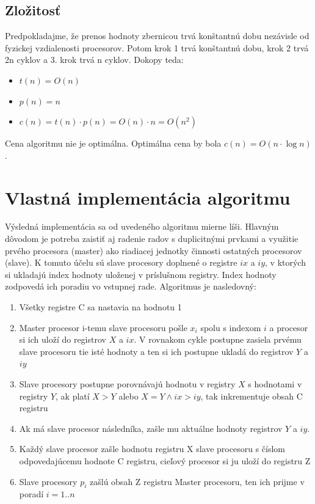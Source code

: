 \documentclass[a4paper,11pt]{article}
\begin{document}
\subsection{Zložitosť}
Predpokladajme, že prenos hodnoty zbernicou trvá konštantnú dobu nezávisle od fyzickej vzdialenosti procesorov. Potom krok 1 trvá konštantnú dobu, krok 2 trvá 2n cyklov a 3. krok trvá n cyklov. Dokopy teda:
\begin{itemize}
\item $ t(n) = O(n) $
\item $ p(n) = n $
\item $ c(n) = t(n) \cdot p(n) = O(n)\cdot n = O(n^2) $
\end{itemize}
Cena algoritmu nie je optimálna. Optimálna cena by bola $ c(n) = O(n \cdot \log n) $.

\section{Vlastná implementácia algoritmu}
Výsledná implementácia sa od uvedeného algoritmu mierne líši. Hlavným dôvodom je potreba zaistiť aj radenie radov s duplicitnými prvkami a využitie prvého procesora (master) ako riadiacej jednotky činnosti ostatných procesorov (slave). K tomuto účelu sú slave procesory doplnené o registre $ix$ a $iy$, v ktorých si ukladajú index hodnoty uloženej v príslušnom registry. Index hodnoty zodpovedá ich poradiu vo vstupnej rade. Algoritmus je nasledovný:
\begin{enumerate}
\item Všetky registre C sa nastavia na hodnotu 1
\item Master procesor i-temu slave procesoru pošle $x_i$ spolu s indexom $i$ a procesor si ich uloží do registrov $X$ a $ix$. V rovnakom cykle postupne zasiela prvému slave procesoru tie isté hodnoty a ten si ich postupne ukladá do registrov $Y$ a $iy$
\item Slave procesory postupne porovnávajú hodnotu v registry $X$ s hodnotami v registry $Y$, ak platí $X > Y$ alebo $X = Y \wedge ix > iy$, tak inkrementuje obsah C registru
\item Ak má slave procesor následníka, zašle mu aktuálne hodnoty registrov $Y$ a $iy$.
\item Každý slave procesor zašle hodnotu registru X slave procesoru s číslom odpovedajúcemu hodnote C registru, cieľový procesor si ju uloží do registru Z
\item Slave procesory $p_i$ zašlú obsah Z registru Master procesoru, ten ich prijme v poradí $i = 1..n$     
\end{enumerate}
\end{document}
